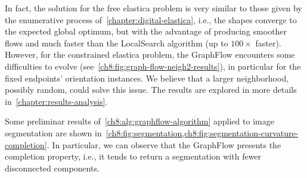 In fact, the solution for the free elastica problem is very similar to those given by the enumerative process of~\cref{chapter:digital-elastica}, i.e., the shapes converge to the expected global optimum, but with the advantage of producing smoother flows and much faster than the LocalSearch algorithm (up to $100 \times$ faster). However, for the constrained elastica problem, the GraphFlow encounters some difficulties to evolve (see~\cref{ch8:fig:graph-flow-neigh2-results}), in particular for the fixed endpoints' orientation instances. We believe that a larger neighborhood, possibly random, could solve this issue. The results are explored in more details in~\cref{chapter:results-analysis}.

Some preliminar results of~\cref{ch8:alg:graphflow-algorithm} applied to image segmentation are shown in~\cref{ch8:fig:segmentation,ch8:fig:segmentation-curvature-completion}. In particular, we can observe that the GraphFlow presents the completion property, i.e., it tends to return a segmentation with fewer disconnected components.

